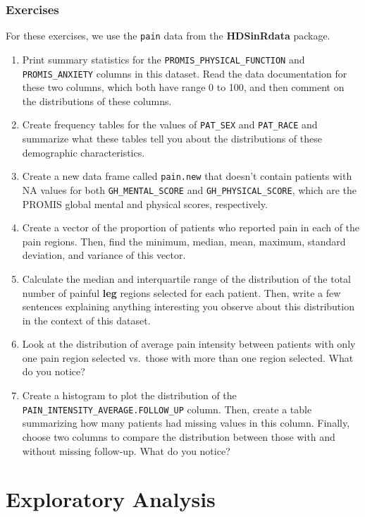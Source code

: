 \documentclass[
  letterpaper,
]{latex/krantz}
\begin{document}
\section{Exercises}\label{exercises-1}

For these exercises, we use the \texttt{pain} data from the
\textbf{HDSinRdata} package.

\begin{enumerate}
\def\labelenumi{\arabic{enumi}.}
\item
  Print summary statistics for the \texttt{PROMIS\_PHYSICAL\_FUNCTION}
  and \texttt{PROMIS\_ANXIETY} columns in this dataset. Read the data
  documentation for these two columns, which both have range 0 to 100,
  and then comment on the distributions of these columns.
\item
  Create frequency tables for the values of \texttt{PAT\_SEX} and
  \texttt{PAT\_RACE} and summarize what these tables tell you about the
  distributions of these demographic characteristics.
\item
  Create a new data frame called \texttt{pain.new} that doesn't contain
  patients with NA values for both \texttt{GH\_MENTAL\_SCORE} and
  \texttt{GH\_PHYSICAL\_SCORE}, which are the PROMIS global mental and
  physical scores, respectively.
\item
  Create a vector of the proportion of patients who reported pain in
  each of the pain regions. Then, find the minimum, median, mean,
  maximum, standard deviation, and variance of this vector.
\item
  Calculate the median and interquartile range of the distribution of
  the total number of painful \textbf{leg} regions selected for each
  patient. Then, write a few sentences explaining anything interesting
  you observe about this distribution in the context of this dataset.
\item
  Look at the distribution of average pain intensity between patients
  with only one pain region selected vs.~those with more than one region
  selected. What do you notice?
\item
  Create a histogram to plot the distribution of the
  \texttt{PAIN\_INTENSITY\_AVERAGE.FOLLOW\_UP} column. Then, create a
  table summarizing how many patients had missing values in this column.
  Finally, choose two columns to compare the distribution between those
  with and without missing follow-up. What do you notice?
\end{enumerate}

\part{Exploratory Analysis}
\end{document}
